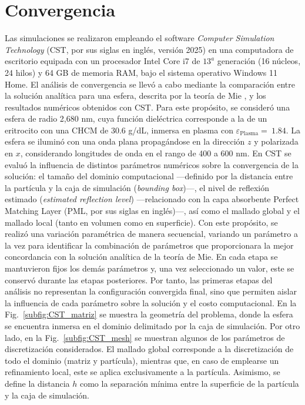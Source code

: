 \section{Convergencia}
\label{section:convergence}

Las simulaciones se realizaron empleando el software \textit{Computer Simulation Technology} (CST, por sus siglas en inglés, versión 2025) en una computadora de escritorio equipada con un procesador Intel Core i7 de $13^a$ generación (16 núcleos, 24 hilos) y 64 GB de memoria RAM, bajo el sistema operativo Windows 11 Home. El análisis de convergencia se llevó a cabo mediante la comparación entre la solución analítica para una esfera, descrita por la teoría de Mie \cite{bohrenAbsorptionScatteringLight2008}, y los resultados numéricos obtenidos con CST. Para este propósito, se consideró una esfera de radio 2,680 nm, cuya función dieléctrica corresponde a la de un eritrocito con una CHCM de 30.6 g/dL, inmersa en plasma con $\varepsilon_{\text{Plasma}}=~1.84$. La esfera se iluminó con una onda plana propagándose en la dirección $z$ y polarizada en $x$, considerando longitudes de onda en el rango de 400 a 600 nm. En CST se evaluó la influencia de distintos parámetros numéricos sobre la convergencia de la solución: el tamaño del dominio computacional ---definido por la distancia entre la partícula y la caja de simulación (\textit{bounding box})---, el nivel de reflexión estimado (\textit{estimated reflection level}) ---relacionado con la capa absorbente Perfect Matching Layer (PML, por sus siglas en inglés)---, así como el mallado global y el mallado local (tanto en volumen como en superficie). Con este propósito, se realizó una variación paramétrica de manera secuencial, variando un parámetro a la vez para identificar la combinación de parámetros que proporcionara la mejor concordancia con la solución analítica de la teoría de Mie. En cada etapa se mantuvieron fijos los demás parámetros y, una vez seleccionado un valor, este se conservó durante las etapas posteriores. Por tanto, las primeras etapas del análisis no representan la configuración convergida final, sino que permiten aislar la influencia de cada parámetro sobre la solución y el costo computacional. En la Fig.~\ref{subfig:CST_matriz} se muestra la geometría del problema, donde la esfera se encuentra inmersa en el dominio delimitado por la caja de simulación. Por otro lado, en la Fig.~\ref{subfig:CST_mesh} se muestran algunos de los parámetros de discretización considerados. El mallado global corresponde a la discretización de todo el dominio (matriz y partícula), mientras que, en caso de emplearse un refinamiento local, este se aplica exclusivamente a la partícula. Asimismo, se define la distancia $h$ como la separación mínima entre la superficie de la partícula y la caja de simulación.

